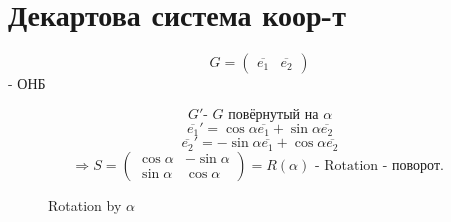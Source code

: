 \section{Декартова система коор-т}

\[
    G = \begin{pmatrix}\overline{e_1} & \overline{e_2} \end{pmatrix}
\] - ОНБ 

\[
    G' \text{- $G$ повёрнутый на $\alpha$}
\] 
\[
    \overline{e_1}' = \cos \alpha \overline{e_1} + \sin \alpha \overline{e_2}
\] 
\[
    \overline{e_2}' = -\sin\alpha \overline{e_1} + \cos \alpha \overline{e_2}
\] 
\[
    \Rightarrow S = \begin{pmatrix}\cos \alpha & -\sin \alpha \\ \sin \alpha & \cos \alpha \end{pmatrix} = R(\alpha) \text{ - Rotation - поворот. }
\] 
\begin{figure}
  \centering
  \caption{Rotation by $\alpha$}
  \label{fig:R(a)}
\end{figure}

\begin{figure}[H]
    \centering
    \caption{}
    \label{fig:nice}
\end{figure}

